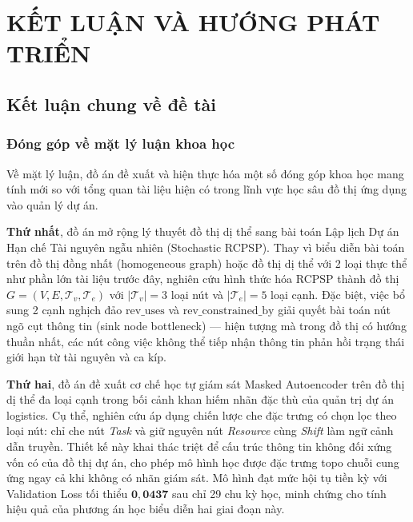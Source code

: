 \chapter{KẾT LUẬN VÀ HƯỚNG PHÁT TRIỂN}
\label{ch:chuong4_ket_luan}

\section{Kết luận chung về đề tài}
\label{sec:4.1_ket_luan_chung}

\subsection{Đóng góp về mặt lý luận khoa học}
\label{sec:4.1.1_dong_gop_ly_luan}

Về mặt lý luận, đồ án đề xuất và hiện thực hóa một số đóng góp khoa học mang tính mới so với tổng quan tài liệu hiện có trong lĩnh vực học sâu đồ thị ứng dụng vào quản lý dự án.

\textbf{Thứ nhất}, đồ án mở rộng lý thuyết đồ thị dị thể sang bài toán Lập lịch Dự án Hạn chế Tài nguyên ngẫu nhiên (Stochastic RCPSP). Thay vì biểu diễn bài toán trên đồ thị đồng nhất (homogeneous graph) hoặc đồ thị dị thể với 2 loại thực thể như phần lớn tài liệu trước đây, nghiên cứu hình thức hóa RCPSP thành đồ thị $G = (V, E, \mathcal{T}_v, \mathcal{T}_e)$ với $|\mathcal{T}_v| = 3$ loại nút và $|\mathcal{T}_e| = 5$ loại cạnh. Đặc biệt, việc bổ sung 2 cạnh nghịch đảo $\text{rev\_uses}$ và $\text{rev\_constrained\_by}$ giải quyết bài toán nút ngõ cụt thông tin (sink node bottleneck) — hiện tượng mà trong đồ thị có hướng thuần nhất, các nút công việc không thể tiếp nhận thông tin phản hồi trạng thái giới hạn từ tài nguyên và ca kíp.

\textbf{Thứ hai}, đồ án đề xuất cơ chế học tự giám sát Masked Autoencoder trên đồ thị dị thể đa loại cạnh trong bối cảnh khan hiếm nhãn đặc thù của quản trị dự án logistics. Cụ thể, nghiên cứu áp dụng chiến lược che đặc trưng có chọn lọc theo loại nút: chỉ che nút \textit{Task} và giữ nguyên nút \textit{Resource} cùng \textit{Shift} làm ngữ cảnh dẫn truyền. Thiết kế này khai thác triệt để cấu trúc thông tin không đối xứng vốn có của đồ thị dự án, cho phép mô hình học được đặc trưng topo chuỗi cung ứng ngay cả khi không có nhãn giám sát. Mô hình đạt mức hội tụ tiền kỳ với Validation Loss tối thiểu $\mathbf{0{,}0437}$ sau chỉ 29 chu kỳ học, minh chứng cho tính hiệu quả của phương án học biểu diễn hai giai đoạn này.

